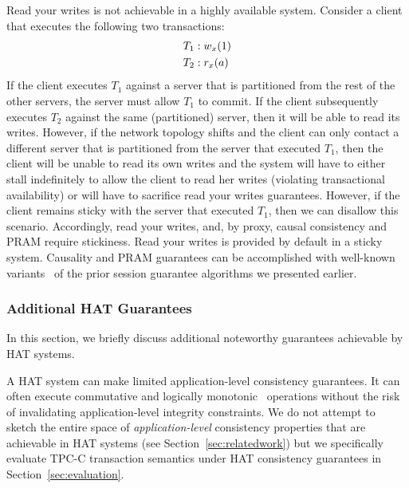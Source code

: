 Read your writes is not achievable in a highly available
system. Consider a client that executes the following two transactions:
\begin{align*}
\small\vspace{-1em}
T_1 &: w_x(1)
\\T_2 &: r_x(a)\vspace{-1em}
\end{align*}
If the client executes $T_1$ against a server that is partitioned from
the rest of the other servers, the server must allow $T_1$ to
commit. If the client subsequently executes $T_2$ against the same
(partitioned) server, then it will be able to read its
writes. However, if the network topology shifts and the client can
only contact a different server that is partitioned from the server
that executed $T_1$, then the client will be unable to read its own
writes and the system will have to either stall indefinitely to allow
the client to read her writes (violating transactional availability)
or will have to sacrifice read your writes guarantees. However, if the
client remains sticky with the server that executed $T_1$, then we can
disallow this scenario. Accordingly, read your writes, and, by proxy,
causal consistency and PRAM require stickiness. Read your writes is
provided by default in a sticky system. Causality and PRAM guarantees
can be accomplished with well-known variants~\cite{causalmemory,
  bolton, cops, sessionguarantees, swift} of the prior session
guarantee algorithms we presented earlier.

\subsubsection{Additional HAT Guarantees}

In this section, we briefly discuss additional noteworthy guarantees
achievable by HAT systems.

\vspace{0.5em}
 A HAT system can make limited
application-level consistency guarantees. It can often execute
commutative and logically monotonic~\cite{calm} operations without the
risk of invalidating application-level integrity constraints. We do
not attempt to sketch the entire space of \textit{application-level}
consistency properties that are achievable in HAT systems (see
Section~\ref{sec:relatedwork}) but we specifically evaluate TPC-C
transaction semantics under HAT consistency guarantees in
Section~\ref{sec:evaluation}.

